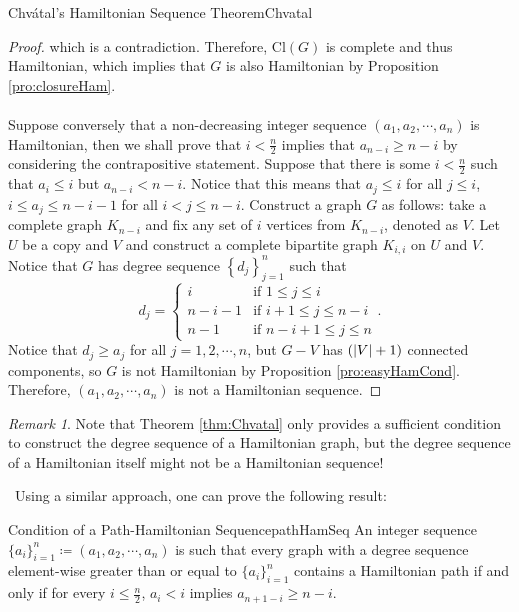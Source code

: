 \documentclass[math]{amznotes}
\theoremstyle{remark}
\newtheorem*{remark}{Remark}
\newcommand{\0}{\mathbf{0}}
\newcommand{\1}{\mathbf{1}}
\begin{document}
\begin{thmbox}{Chv\'{a}tal's Hamiltonian Sequence Theorem}{Chvatal}
\begin{proof}
        which is a contradiction. Therefore, $\mathrm{Cl}(G)$ is complete and thus Hamiltonian, which implies that $G$ is also Hamiltonian by Proposition \ref{pro:closureHam}.
        \\\\
        Suppose conversely that a non-decreasing integer sequence $(a_1, a_2, \cdots, a_n)$ is Hamiltonian, then we shall prove that $i < \frac{n}{2}$ implies that $a_{n - i} \geq n - i$ by considering the contrapositive statement. Suppose that there is some $i < \frac{n}{2}$ such that $a_i \leq i$ but $a_{n - i} < n - i$. Notice that this means that $a_j \leq i$ for all $j \leq i$, $i \leq a_j \leq n - i - 1$ for all $i < j \leq n - i$. Construct a graph $G$ as follows: take a complete graph $K_{n - i}$ and fix any set of $i$ vertices from $K_{n - i}$, denoted as $V$. Let $U$ be a copy and $V$ and construct a complete bipartite graph $K_{i, i}$ on $U$ and $V$. Notice that $G$ has degree sequence $\left\{d_j\right\}_{j = 1}^{n}$ such that 
        \begin{equation*}
            d_j = \begin{cases}
                i & \textrm{if } 1 \leq j \leq i \\
                n - i - 1 & \textrm{if } i + 1 \leq j \leq n - i \\
                n - 1 & \textrm{if } n - i + 1 \leq j \leq n
            \end{cases}.
        \end{equation*}
        Notice that $d_j \geq a_j$ for all $j = 1, 2, \cdots, n$, but $G - V$ has $({\left\lvert {V} \right\rvert} + 1)$ connected components, so $G$ is not Hamiltonian by Proposition \ref{pro:easyHamCond}. Therefore, $(a_1, a_2, \cdots, a_n)$ is not a Hamiltonian sequence.
    \end{proof}
\end{thmbox}
\begin{notebox}
    \begin{remark}      
        Note that Theorem \ref{thm:Chvatal} only provides a sufficient condition to construct the degree sequence of a Hamiltonian graph, but the degree sequence of a Hamiltonian itself might not be a Hamiltonian sequence!  
    \end{remark}        
\end{notebox}\
Using a similar approach, one can prove the following result:
\begin{thmbox}{Condition of a Path-Hamiltonian Sequence}{pathHamSeq}
    An integer sequence $\{a_i\}_{i = 1}^n \coloneqq (a_1, a_2, \cdots, a_n)$ is such that every graph with a degree sequence element-wise greater than or equal to $\{a_i\}_{i = 1}^n$ contains a Hamiltonian path if and only if for every $i \leq \frac{n}{2}$, $a_i < i$ implies $a_{n + 1 - i} \geq n - i$.
\end{thmbox}
\end{document}
